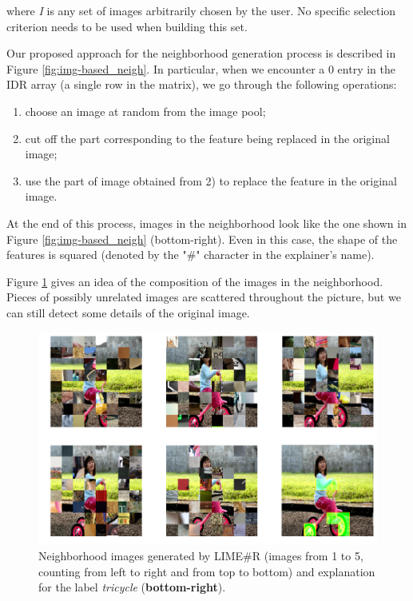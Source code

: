 \documentclass[12pt, twoside, a4paper]{report}
\begin{document}
where \textit{I} is any set of images arbitrarily chosen by the user. No specific selection criterion needs to be used when building this set.

Our proposed approach for the neighborhood generation process is described in Figure \ref{fig:img-based_neigh}. In particular, when we encounter a 0 entry in the IDR array (a single row in the matrix), we go through the following operations:

\begin{enumerate}
\item choose an image at random from the image pool;
\item cut off the part corresponding to the feature being replaced in the original image;
\item use the part of image obtained from 2) to replace the feature in the original image.
\end{enumerate}

At the end of this process, images in the neighborhood look like the one shown in Figure \ref{fig:img-based_neigh} (bottom-right). Even in this case, the shape of the features is squared (denoted by the "\#" character in the explainer's name).

Figure \ref{fig:limesharpR_neigh} gives an idea of the composition of the images in the neighborhood. Pieces of possibly unrelated images are scattered throughout the picture, but we can still detect some details of the original image.

\begin{figure}
\begin{center}
\includegraphics[width=.85\textwidth]{images/limesharpR_neighborhood.png} 
\caption{Neighborhood images generated by LIME\#R (images from 1 to 5, counting from left to right and from top to bottom) and explanation for the label \textit{tricycle} (\textbf{bottom-right}).}
\label{fig:limesharpR_neigh}
\end{center}
\end{figure}
\end{document}
